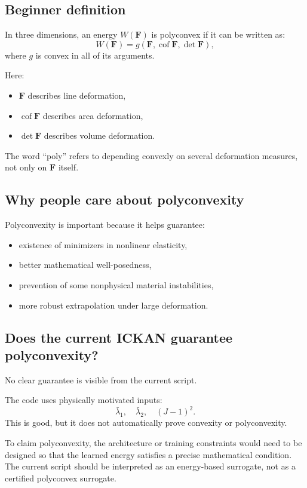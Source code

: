 \documentclass[11pt]{article}
\newcommand{\F}{\bm{F}}
\begin{document}
\subsection{Beginner definition}

In three dimensions, an energy $W(\F)$ is polyconvex if it can be written as:
\[
  W(\F) = g(\F,\operatorname{cof}\F,\det\F),
\]
where $g$ is convex in all of its arguments.

Here:

\begin{itemize}[leftmargin=2em]
  \item $\F$ describes line deformation,
  \item $\operatorname{cof}\F$ describes area deformation,
  \item $\det\F$ describes volume deformation.
\end{itemize}

The word ``poly'' refers to depending convexly on several deformation measures,
not only on $\F$ itself.

\subsection{Why people care about polyconvexity}

Polyconvexity is important because it helps guarantee:

\begin{itemize}[leftmargin=2em]
  \item existence of minimizers in nonlinear elasticity,
  \item better mathematical well-posedness,
  \item prevention of some nonphysical material instabilities,
  \item more robust extrapolation under large deformation.
\end{itemize}

\subsection{Does the current ICKAN guarantee polyconvexity?}

No clear guarantee is visible from the current script.

The code uses physically motivated inputs:
\[
  \bar{\lambda}_1,\quad
  \bar{\lambda}_2,\quad
  (J-1)^2.
\]
This is good, but it does not automatically prove convexity or polyconvexity.

To claim polyconvexity, the architecture or training constraints would need to
be designed so that the learned energy satisfies a precise mathematical
condition. The current script should be interpreted as an energy-based surrogate,
not as a certified polyconvex surrogate.
\end{document}
